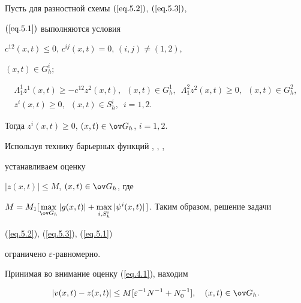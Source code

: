 \begin{lems} \label{l5.1}


Пусть для разностной схемы $(\ref{eq.5.2})$, $(\ref{eq.5.3})$,


$(\ref{eq.5.1})$ выполняются условия


$c^{12}(x, t){\le}0$, $c^{ij}(x, t)=0$, $(i, j)\ne(1, 2)$,


$(x, t)\in G^i_h;$


\begin{gather*}


\Lambda^1_1 z^1(x, t)\ge -c^{12} z^2(x, t), \ \; (x, t)\in G^1_h,\ \;


\Lambda^2_1 z^2(x, t)\ge 0, \ \;(x, t)\in G^2_h,\\


%


z^i(x, t)\ge 0, \ \; (x, t)\in S^i_h, \ \; i=1, 2.


\end{gather*}


Тогда $z^i(x, t)\ge 0$, $(x, t)\in \ov G_h$, $i=1, 2$.


\end{lems}





Используя технику барьерных функций \cite{2}, \cite{10}, \cite{11},


устанавливаем оценку


$|z(x, t)|\le M$, $(x, t)\in \ov G_h$, где


$M=M_1[\max\limits_{\ov G_h}|g(x, t)|+\max\limits_{i,


S^i_h}|\psi^i(x, t)|\,]$. Таким образом, решение задачи


(\ref{eq.5.2}), (\ref{eq.5.3}), (\ref{eq.5.1})


ограничено $\varepsilon$-равномерно.





Принимая во внимание оценку (\ref{eq.4.1}), находим


\begin{equation}


\label{eq.5.4}


|v(x, t)-z(x, t)|\le M [\varepsilon^{-1} N^{-1}+N_0^{-1}], \quad


(x, t)\in \ov G_h.


\end{equation}





